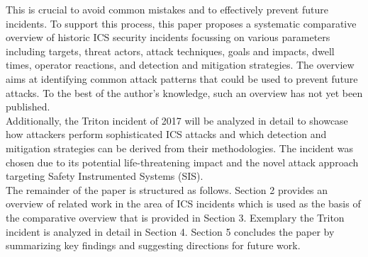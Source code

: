 \documentclass[runningheads]{llncs}
\begin{document}
This is crucial to avoid common mistakes and to effectively prevent future incidents.
To support this process, this paper proposes a systematic comparative overview of historic ICS security incidents focussing on various parameters including targets, threat actors, attack techniques, goals and impacts, dwell times, operator reactions, and detection and mitigation strategies.
The overview aims at identifying common attack patterns that could be used to prevent future attacks.
To the best of the author's knowledge, such an overview has not yet been published.\\
Additionally, the Triton incident of 2017 will be analyzed in detail to showcase how attackers perform sophisticated ICS attacks and which detection and mitigation strategies can be derived from their methodologies.
The incident was chosen due to its potential life-threatening impact and the novel attack approach targeting Safety Instrumented Systems (SIS).\\
The remainder of the paper is structured as follows.
Section 2 provides an overview of related work in the area of ICS incidents which is used as the basis of the comparative overview that is provided in Section 3.
Exemplary the Triton incident is analyzed in detail in Section 4.
Section 5 concludes the paper by summarizing key findings and suggesting directions for future work.
\end{document}
